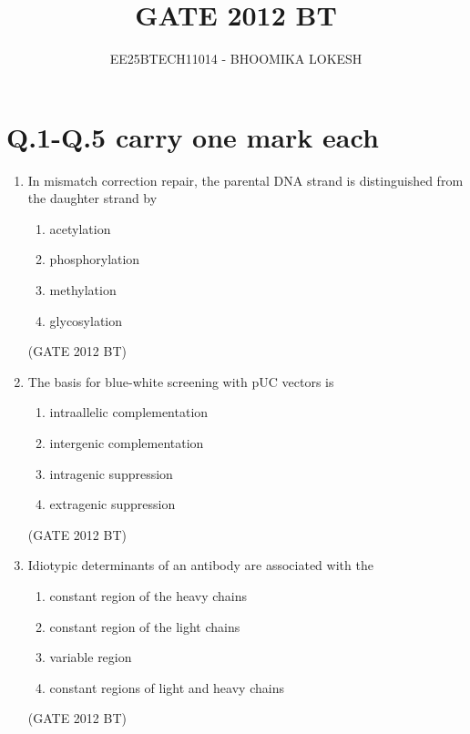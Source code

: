 \documentclass[journal,12pt,onecolumn]{IEEEtran}
\theoremstyle{remark}
\begin{document}
\title{GATE 2012 BT}
\author{EE25BTECH11014 - BHOOMIKA LOKESH}
\maketitle

\renewcommand{\thefigure}{\theenumi}
\renewcommand{\thetable}{\theenumi}

\section{Q.1-Q.5 carry one mark each}
\begin{enumerate}
\item In mismatch correction repair, the parental DNA strand is distinguished from the daughter strand by
\begin{multicols}{4}
\begin{enumerate}
\item acetylation
\item phosphorylation
\item methylation
\item glycosylation
\end{enumerate}
\end{multicols} \hfill(GATE 2012 BT)

\item  The basis for blue-white screening with pUC vectors is
\begin{multicols}{4}
\begin{enumerate}
\item intraallelic complementation
\item  intergenic complementation
\item  intragenic suppression	
\item  extragenic suppression
\end{enumerate}
\end{multicols} \hfill(GATE 2012 BT)

    \item Idiotypic determinants of an antibody are associated with the
\begin{multicols}{2}
\begin{enumerate}
\item 	constant region of the heavy chains
\item  constant region of the light chains
\item  variable region	
\item  constant regions of light and heavy chains
\end{enumerate}
\end{multicols} \hfill(GATE 2012 BT)


\end{enumerate}
\end{document}
